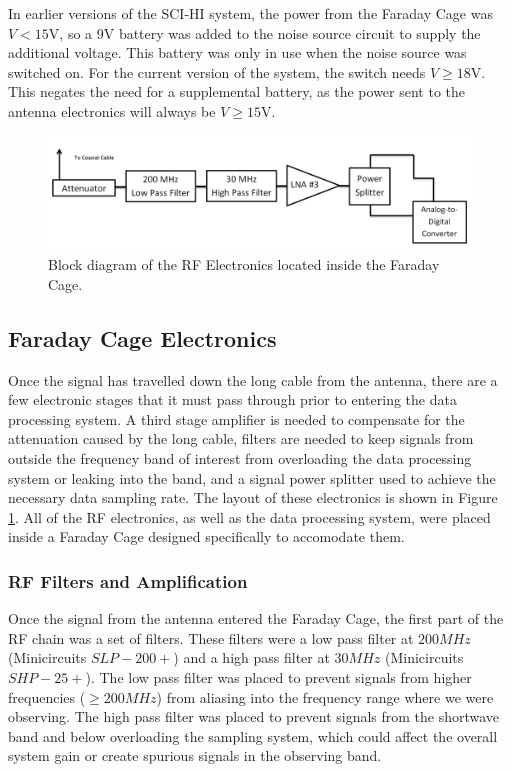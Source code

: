 In earlier versions of the SCI-HI system, the power from the Faraday Cage was $V< 15$V, so a 9V battery was added to the noise source circuit to supply the additional voltage. This battery was only in use when the noise source was switched on. For the current version of the system, the switch needs $V \geq 18$V. This negates the need for a supplemental battery, as the power sent to the antenna electronics will always be $V \geq 15$V.  

\begin{figure}[htb]
\begin{center}
\includegraphics[width=0.9\linewidth]{SCIHI_system/figures/faraday_cage_rf_block_diagram.png}
\caption{Block diagram of the RF Electronics located inside the Faraday Cage.}
\label{Fig:fcage_RF_block_diagram}
\end{center}
\end{figure}


\subsection{Faraday Cage Electronics}

Once the signal has travelled down the long cable from the antenna, there are a few electronic stages that it must pass through prior to entering the data processing system. A third stage amplifier is needed to compensate for the attenuation caused by the long cable, filters are needed to keep signals from outside the frequency band of interest from overloading the data processing system or leaking into the band, and a signal power splitter used to achieve the necessary data sampling rate. The layout of these electronics is shown in Figure \ref{Fig:fcage_RF_block_diagram}. All of the RF electronics, as well as the data processing system, were placed inside a Faraday Cage designed specifically to accomodate them. 

\subsubsection{RF Filters and Amplification} \label{Sec:fcage_elec}

Once the signal from the antenna entered the Faraday Cage, the first part of the RF chain was a set of filters. These filters were a low pass filter at $200 MHz$ (Minicircuits $SLP-200+$) and a high pass filter at $30 MHz$ (Minicircuits $SHP-25+$). The low pass filter was placed to prevent signals from higher frequencies ($\geq 200 MHz$) from aliasing into the frequency range where we were observing. The high pass filter was placed to prevent signals from the shortwave band and below overloading the sampling system, which could affect the overall system gain or create spurious signals in the observing band. 


